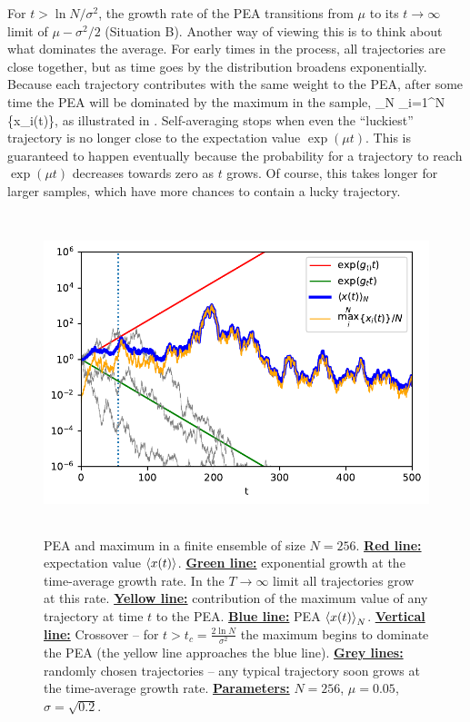 For $t>\ln N/\sigma^2$, the growth rate of the PEA transitions from $\mu$ to its $t\to\infty$ limit of $\mu-\sigma^2/2$ (Situation B). 
Another way of viewing this is to think about what dominates the average. For early times in the process, all trajectories are close together, but as time goes by the distribution broadens exponentially. Because each trajectory contributes with the same weight to the PEA, after some time the PEA will be dominated by the maximum in the sample,
\be
{}_N \approx {}\max_{i=1}^N \{x_i(t)\},
\ee
as illustrated in .
Self-averaging stops when even the ``luckiest'' trajectory is no longer close to the expectation value $\exp(\mu t)$. This is guaranteed to happen eventually because the probability for a trajectory to reach $\exp(\mu t)$ decreases towards zero as $t$ grows. Of course, this takes longer for larger samples, which have more chances to contain a lucky trajectory. 

\begin{figure}
\centering
\includegraphics[height=9.3cm]{./chapter_3/figs/trajectories.pdf}
\caption{PEA and maximum in a finite ensemble of size $N=256$. {\bf \underline{Red line:}} expectation value $\left\langle x(t) \right\rangle$. 
{\bf \underline{Green line:}} exponential growth at the time-average growth rate. In the $T\to\infty$ limit all trajectories grow at this rate. 
{\bf \underline{Yellow line:}} contribution of the maximum value of any trajectory at time $t$ to the PEA.  
{\bf \underline{Blue line:}} PEA $\left\langle x(t) \right\rangle_N$.
{\bf \underline{Vertical line:}} Crossover -- for $t>t_c=\frac{2\ln N}{\sigma^2}$ the maximum begins to dominate the PEA (the yellow line approaches the blue line).
{\bf \underline{Grey lines:}} randomly chosen trajectories -- any typical trajectory soon grows at the time-average growth rate.  
{\bf \underline{Parameters:}} $N=256$, $\mu=0.05$, $\sigma=\sqrt{0.2}$.}
\end{figure}
\FloatBarrier

